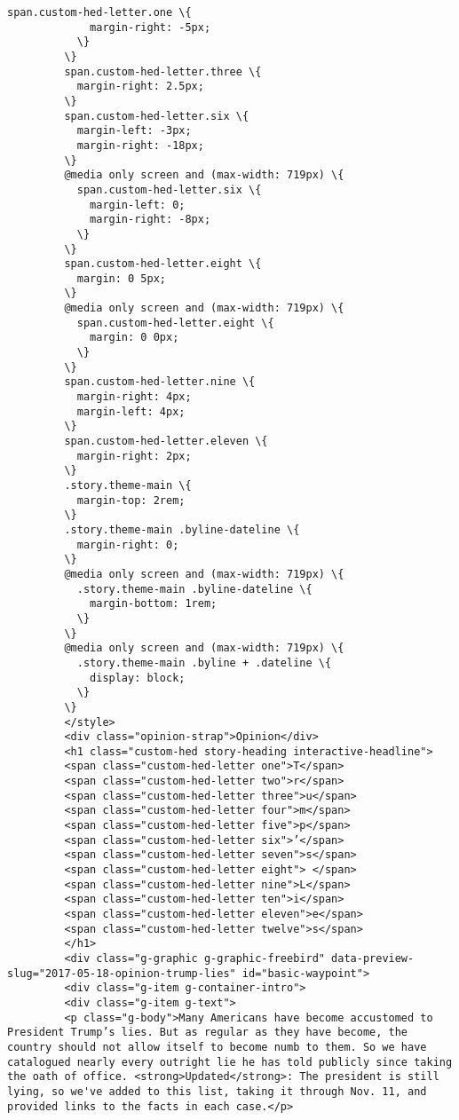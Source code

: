 \documentclass[11pt]{article}
\begin{document}
\begin{Verbatim}[commandchars=\\\{\}]
           span.custom-hed-letter.one \{
             margin-right: -5px;
           \}
         \}
         span.custom-hed-letter.three \{
           margin-right: 2.5px;
         \}
         span.custom-hed-letter.six \{
           margin-left: -3px;
           margin-right: -18px;
         \}
         @media only screen and (max-width: 719px) \{
           span.custom-hed-letter.six \{
             margin-left: 0;
             margin-right: -8px;
           \}
         \}
         span.custom-hed-letter.eight \{
           margin: 0 5px;
         \}
         @media only screen and (max-width: 719px) \{
           span.custom-hed-letter.eight \{
             margin: 0 0px;
           \}
         \}
         span.custom-hed-letter.nine \{
           margin-right: 4px;
           margin-left: 4px;
         \}
         span.custom-hed-letter.eleven \{
           margin-right: 2px;
         \}
         .story.theme-main \{
           margin-top: 2rem;
         \}
         .story.theme-main .byline-dateline \{
           margin-right: 0;
         \}
         @media only screen and (max-width: 719px) \{
           .story.theme-main .byline-dateline \{
             margin-bottom: 1rem;
           \}
         \}
         @media only screen and (max-width: 719px) \{
           .story.theme-main .byline + .dateline \{
             display: block;
           \}
         \}
         </style>
         <div class="opinion-strap">Opinion</div>
         <h1 class="custom-hed story-heading interactive-headline">
         <span class="custom-hed-letter one">T</span>
         <span class="custom-hed-letter two">r</span>
         <span class="custom-hed-letter three">u</span>
         <span class="custom-hed-letter four">m</span>
         <span class="custom-hed-letter five">p</span>
         <span class="custom-hed-letter six">’</span>
         <span class="custom-hed-letter seven">s</span>
         <span class="custom-hed-letter eight"> </span>
         <span class="custom-hed-letter nine">L</span>
         <span class="custom-hed-letter ten">i</span>
         <span class="custom-hed-letter eleven">e</span>
         <span class="custom-hed-letter twelve">s</span>
         </h1>
         <div class="g-graphic g-graphic-freebird" data-preview-slug="2017-05-18-opinion-trump-lies" id="basic-waypoint">
         <div class="g-item g-container-intro">
         <div class="g-item g-text">
         <p class="g-body">Many Americans have become accustomed to President Trump’s lies. But as regular as they have become, the country should not allow itself to become numb to them. So we have catalogued nearly every outright lie he has told publicly since taking the oath of office. <strong>Updated</strong>: The president is still lying, so we've added to this list, taking it through Nov. 11, and provided links to the facts in each case.</p>

\end{Verbatim}
\end{document}
